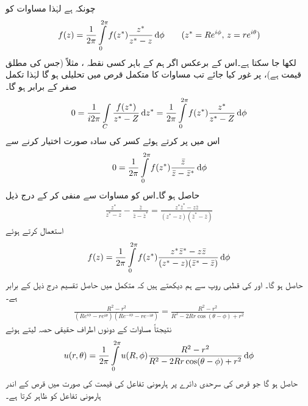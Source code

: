 چونکہ  ہے لہٰذا مساوات  کو 
\begin{align}\label{مساوات_مخفی_معمہ_ب}
f(z)=\frac{1}{2\pi}\int\limits_{0}^{2\pi} f(z^*)\frac{z^*}{z^*-z}\dif \phi\quad \quad (z^*=Re^{i\phi},\,z=re^{i\theta})
\end{align}
لکھا جا سکتا ہے۔اس کے برعکس اگر ہم  کے باہر کسی نقطہ ، مثلاً  (جس کی مطلق قیمت  ہے)، پر غور کیا جائے  تب مساوات  کا متکمل قرص  میں تحلیلی ہو گا لہٰذا تکمل صفر کے برابر ہو گا۔
\begin{align*}
0=\frac{1}{i2\pi}\int\limits_C \frac{f(z^*)}{z^*-Z}\dif z^*=\frac{1}{2\pi}\int\limits_{0}^{2\pi}f(z^*)\frac{z^*}{z^*-Z}\dif \phi
\end{align*}
اس میں  پر کرتے ہوئے  کسر کی سادہ صورت اختیار کرنے سے
\begin{align*}
0=\frac{1}{2\pi}\int\limits_{0}^{2\pi} f(z^*)\frac{\bar{z}}{\bar{z}-\bar{z}^*}\dif\phi
\end{align*}
حاصل ہو گا۔اس کو مساوات  سے منفی کر کے درج ذیل
\begin{align}\label{مساوات_مخفی_معمہ_پ}
\frac{z^*}{z^*-z}-\frac{\bar{z}}{\bar{z}-\bar{z}^*}=\frac{z^*\bar{z}^*-z\bar{z}}{(z^*-z)(\bar{z}^*-\bar{z})}
\end{align}
استعمال کرتے ہوئے 
\begin{align}\label{مساوات_مخفی_معمہ_ت}
f(z)=\frac{1}{2\pi}\int\limits_{0}^{2\pi}f(z^*)\frac{z^*\bar{z}^*-z\bar{z}}{(z^*-z)(\bar{z}^*-\bar{z})}\dif \phi
\end{align}
حاصل ہو گا۔ اور  کی قطبی روپ سے ہم دیکھتے ہیں کہ متکمل میں حاصل تقسیم درج ذیل کے برابر ہے۔
\begin{align*}
\frac{R^2-r^2}{(Re^{i\phi}-re^{i\theta})(Re^{-i\phi}-re^{-i\theta})}=\frac{R^2-r^2}{R^2-2Rr\cos(\theta-\phi)+r^2}
\end{align*}
نتیجتاً مساوات  کے دونوں اطراف حقیقی حصہ لیتے ہوئے 
\begin{align}\label{مساوات_مخفی_معمہ_ٹ}
u(r,\theta)=\frac{1}{2\pi}\int\limits_{0}^{2\pi} u(R,\phi) \frac{R^2-r^2}{R^2-2Rr\cos(\theta-\phi)+r^2} \dif \phi
\end{align}
حاصل ہو گا جو قرص  کی سرحدی دائرے پر ہارمونی تفاعل کی قیمت  کی صورت میں قرص کے اندر  ہارمونی تفاعل  کو ظاہر کرتا ہے۔

